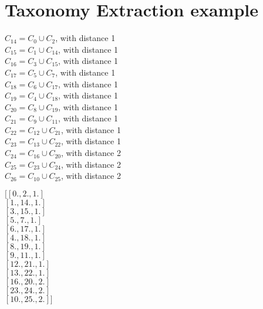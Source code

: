 \section{Taxonomy Extraction example}
\begin{minipage}{0.4\textwidth}
$C_{14} = C_0 \cup C_2$, with distance 1 \\
$C_{15} = C_1 \cup C_14$, with distance 1 \\
$C_{16} = C_3 \cup C_15$, with distance 1 \\
$C_{17} = C_5 \cup C_7$, with distance 1 \\
$C_{18} = C_6 \cup C_17$, with distance 1 \\
$C_{19} = C_4 \cup C_18$, with distance 1 \\
$C_{20} = C_8 \cup C_19$, with distance 1 \\
$C_{21} = C_9 \cup C_11$, with distance 1 \\
$C_{22} = C_12 \cup C_21$, with distance 1 \\
$C_{23} = C_13 \cup C_22$, with distance 1 \\
$C_{24} = C_16 \cup C_20$, with distance 2 \\
$C_{25} = C_23 \cup C_24$, with distance 2 \\
$C_{26} = C_10 \cup C_25$, with distance 2 \\
\end{minipage} \hfill
\begin{minipage}{0.4\textwidth}
$[[ 0.,  2.,  1.]$ \\
 $[ 1., 14.,  1.]$\\
 $[ 3., 15.,  1.]$\\
 $[ 5.,  7.,  1.]$\\
 $[ 6., 17.,  1.]$\\
 $[ 4., 18.,  1.]$\\
 $[ 8., 19.,  1.]$\\
 $[ 9., 11.,  1.]$\\
 $[12., 21.,  1.]$\\
 $[13., 22.,  1.]$\\
 $[16., 20.,  2.]$\\
 $[23., 24.,  2.]$\\
 $[10., 25.,  2.]]$ \\
\end{minipage} \\

